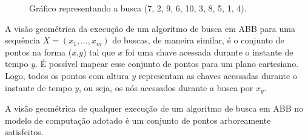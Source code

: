 \begin{figure}
    \caption{Gráfico representando a busca (7, 2, 9, 6, 10, 3, 8, 5, 1, 4).}
\label{fig:busca_padrao}
\end{figure}

A visão geométrica da execução de um algoritmo de busca em ABB para uma sequência $X = (x_{1},\ldots,x_{m})$ de buscas, de maneira similar, é o conjunto de pontos na forma ($x$,$y$) tal que $x$ foi uma chave acessada durante o instante de tempo $y$. É possível mapear esse conjunto de pontos para um plano cartesiano. Logo, todos os pontos com altura $y$ representam as chaves acessadas durante o instante de tempo $y$, ou seja, os nós acessados durante a busca por $x_y$. 

\begin{lemma} A visão geométrica de qualquer execução de um algoritmo de busca em ABB no modelo de computação adotado é um conjunto de pontos arboreamente satisfeitos.
\end{lemma}

